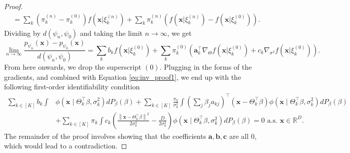 \documentclass[bj,authoryear]{imsart}
\theoremstyle{plain}
\theoremstyle{remark}
\def\ba{\mathbf{a}}
\def\bb{\mathbf{b}}
\def\bc{\mathbf{c}}
\def\bx{\mathbf{x}}
\def\bbR{\mathbb{R}}
\def\norm#1{\left\|#1\right\|}
\begin{document}
\begin{appendix}
\begin{proof}
\begin{align}
    &= \sum_k \left(\pi_k^{(n)} - \pi_k^{(0)}\right)f(\bx|\xi_k^{(n)}) + \sum_k \pi_k^{(n)}\left(f(\bx|\xi_k^{(n)}) - f(\bx|\xi_k^{(0)})\right).
\end{align}
Dividing by $d(\psi_n,\psi_0)$ and taking the limit $n\to\infty$, we get
\begin{equation}
    \lim_{n\to\infty} \frac{p_{\psi_n}(\bx) - p_{\psi_0}(\bx)}{d(\psi_n,\psi_0)} = \sum_k b_k f(\bx|\xi_k^{(0)}) + \sum_k \pi_k^{(0)} \left(\ba_k^\top\nabla_{\Theta}f(\bx|\xi_k^{(0)}) + c_k\nabla_{\sigma^2} f(\bx|\xi_k^{(0)})\right).
\end{equation}
From here onwards, we drop the superscript $(0)$. Plugging in the forms of the gradients, and combined with Equation \eqref{eq:inv_proof1}, we end up with the following first-order identifiability condition
\begin{equation}\label{eq:first-order identity}
\begin{aligned}
    \sum_{k\in[K]} b_k\int &\phi(\bx\mid \Theta_k^\top\beta, \sigma_k^2)dP_{\beta}(\beta) + \sum_{k\in[K]} \frac{\pi_k}{\sigma_k^2} \int \left(\sum_j \beta_j a_{kj}\right)^\top \left(\bx - \Theta_k^\top\beta\right) \phi(\bx\mid \Theta_k^\top\beta,\sigma_k^2)dP_{\beta}(\beta) \\
        &+ \sum_{k\in[K]} \pi_k \int c_k\left(\frac{\norm{\bx - \Theta_k^\top\beta}^2}{2\sigma_k^4} - \frac{D}{2\sigma_k^2}\right)\phi(\bx\mid \Theta_k^\top\beta,\sigma_k^2) dP_{\beta}(\beta) = 0 \text{ a.s. } \bx\in\bbR^D.
\end{aligned}
\end{equation}
The remainder of the proof involves showing that the coefficients $\ba, \bb, \bc$ are all 0, which would lead to a contradiction.



\end{proof}
\end{appendix}
\end{document}
